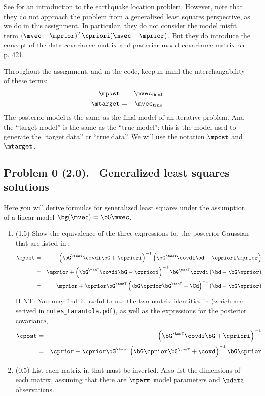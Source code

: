 \documentclass[11pt,titlepage,fleqn]{article}
\begin{document}
See \citet[][Chapter 7]{SteinWysession} for an introduction to the earthquake location problem. However, note that they do not approach the problem from a generalized least squares perspective, as we do in this assignment. In particular, they do not consider the model misfit term $(\mvec-\mprior)^T \cpriori (\mvec-\mprior)$. But they do introduce the concept of the data covariance matrix and posterior model covariance matrix on p. 421.

Throughout the assignment, and in the code, keep in mind the interchangability of these terms:
%
\begin{eqnarray*}
\mpost &=& \mvec_{\rm final}
\\
\mtarget &=& \mvec_{\rm true}
\end{eqnarray*}
%
The posterior model is the same as the final model of an iterative problem. And the ``target model'' is the same as the ``true model'': this is the model used to generate the ``target data'' or ``true data''. We will use the notation $\mpost$ and $\mtarget$.


\pagebreak
\subsection*{Problem 0 (2.0). \ptag\ Generalized least squares solutions}

Here you will derive formulas for generalized least squares under the assumption of a linear model $\bg(\mvec) = \bG\mvec$.
%
\begin{enumerate}
\item (1.5) Show the equivalence of the three expressions for the posterior Gaussian that are listed in \citet[][p.~66]{Tarantola2005}:
%
\begin{eqnarray}
\mpost &=& \left(\bG^{\tssT} \covdi \bG + \cpriori \right)^{-1}
\left( \bG^{\tssT} \covdi \bd + \cpriori\mprior \right)
\label{mpost1}
\\
&=& \mprior + \left(\bG^{\tssT} \covdi \bG + \cpriori \right)^{-1} \bG^{\tssT} \covdi \left( \bd - \bG \mprior\right)
\label{mpost2}
\\
&=& \mprior + \cprior \bG^{\tssT} \left( \bG \cprior \bG^{\tssT} + \Cd\right)^{-1} \left( \bd - \bG \mprior\right)
\label{mpost3}
\end{eqnarray}
%
HINT: You may find it useful to use the two matrix identities in \citet[][Eq.~6.525]{Tarantola2005} (which are serived in \verb+notes_tarantola.pdf+), as well as the expressions for the posterior covariance,
%
\begin{eqnarray}
\cpost &=& \left(\bG^{\tssT} \covdi \bG + \cpriori \right)^{-1}
\label{cpost1}
\\
&=& \cprior - \cprior \bG^{\tssT} \left( \bG \cprior \bG^{\tssT} + \covd \right)^{-1} \bG \cprior
\label{cpost2}
\end{eqnarray}

\item (0.5) List each matrix in  that must be inverted. Also list the dimensions of each matrix, assuming that there are $\nparm$ model parameters and $\ndata$ observations.
\end{enumerate}
\end{document}
